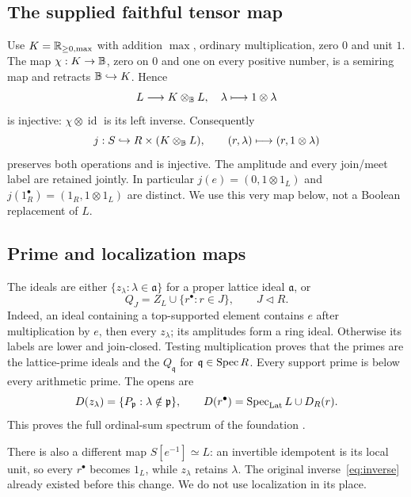 \documentclass[11pt,a4paper]{article}
\theoremstyle{definition}\newtheorem{definition}[theorem]{Definition}\newtheorem{remark}[theorem]{Remark}
\begin{document}
\subsection{The supplied faithful tensor map}
Use $K=\mathbb R_{\ge0,\max}$ with addition $\max$, ordinary multiplication, zero $0$ and unit $1$. The map $\chi:K\to\mathbb B$, zero on $0$ and one on every positive number, is a semiring map and retracts $\mathbb B\hookrightarrow K$. Hence
\begin{equation}
 L\longrightarrow K\otimes_\mathbb B L,\quad\lambda\longmapsto1\otimes\lambda
                                                        \label{eq:tensor}
\end{equation}
is injective: $\chi\otimes\operatorname{id}$ is its left inverse. Consequently
\begin{equation}
 j:S\hookrightarrow R\times(K\otimes_\mathbb B L),\qquad
 (r,\lambda)\longmapsto(r,1\otimes\lambda)               \label{eq:jfull}
\end{equation}
preserves both operations and is injective. The amplitude and every join/meet label are retained jointly. In particular $j(e)=(0,1\otimes1_L)$ and $j(1_R^\bullet)=(1_R,1\otimes1_L)$ are distinct. We use this very map below, not a Boolean replacement of $L$.

\subsection{Prime and localization maps}
The ideals are either $\{z_\lambda:\lambda\in\mathfrak a\}$ for a proper lattice ideal $\mathfrak a$, or
\[
 Q_J=Z_L\cup\{r^\bullet:r\in J\},\qquad J\triangleleft R.
\]
Indeed, an ideal containing a top-supported element contains $e$ after multiplication by $e$, then every $z_\lambda$; its amplitudes form a ring ideal. Otherwise its labels are lower and join-closed. Testing multiplication proves that the primes are the lattice-prime ideals and the $Q_\mathfrak q$ for $\mathfrak q\in\operatorname{Spec} R$. Every support prime is below every arithmetic prime. The opens are
\[
 D(z_\lambda)=\{P_\mathfrak p:\lambda\notin\mathfrak p\},\qquad
 D(r^\bullet)=\operatorname{Spec}_{\rm Lat}L\cup D_R(r).
\]
This proves the full ordinal-sum spectrum of the foundation \cite{V11}.

There is also a different map $S[e^{-1}]\simeq L$: an invertible idempotent is its local unit, so every $r^\bullet$ becomes $1_L$, while $z_\lambda$ retains $\lambda$. The original inverse~\eqref{eq:inverse} already existed before this change. We do not use localization in its place.
\end{document}
